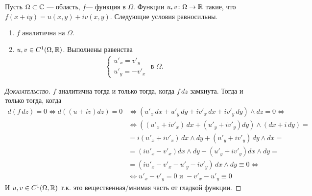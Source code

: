 \documentclass[../complex-analysis.tex]{subfiles}
\begin{document}
\begin{thm}
\label{theorem:cauchy_riman}
 Пусть $ \Omega \subset \mathbb{C} $ --- область, $ f $--- функция в $ \Omega $. Функции $ u, v \colon \Omega \to \mathbb{R} $ такие, что $ f(x + iy) = u(x, y) + iv(x,y) $. Следующие условия равносильны.
 \begin{enumerate}
  \item $ f $ аналитична на $ \Omega $.
  \item $ u,v \in C^{1}(\Omega, \mathbb{R}) $. Выполнены равенства
   \begin{align*}
    \begin{cases}
     u'_x = v'_y \\
     u'_y = -v'_x
 \end{cases} \text{ в } \Omega.
   \end{align*}
 \end{enumerate}
\end{thm}
\begin{proof}[\normalfont\textsc{Доказательство}]
 $ f $ аналитична тогда и только тогда, когда $ f \, dz $ замкнута. Тогда и только тогда, когда 
\begin{align*}
d(f\,dz) = 0 \iff d((u+iv)dz) = 0 &\iff (u'_x\,dx+u'_y\,dy+iv'_x\,dx+iv'_y\,dy) \land dz = 0 \iff \\
&\iff ((u'_x + iv'_x)\,dx + (u'_y + iv'_y)dy) \land (dx + i\,dy) = \\
& = i(u'_x + iv'_x)\,dx \land dy +  (u'_y + iv'_y)\,dy\land dx = \\
& = (i u'_x - v'_x) dx \land dy - (u'_y + iv'_y) dx \land dy = \\
& = (iu'_x - v'_x - u'_y - iv'_y)\,dx \land dy \equiv 0 \iff \\
& \iff u'_x - v'_y = 0 \text{ и } -v'_x - u'_y \equiv 0
\end{align*} 
И $u, v \in C^1(\Omega, \mathbb{R})$ т.к. это вещественная/мнимая часть от гладкой функции. 
\end{proof}
\end{document}
